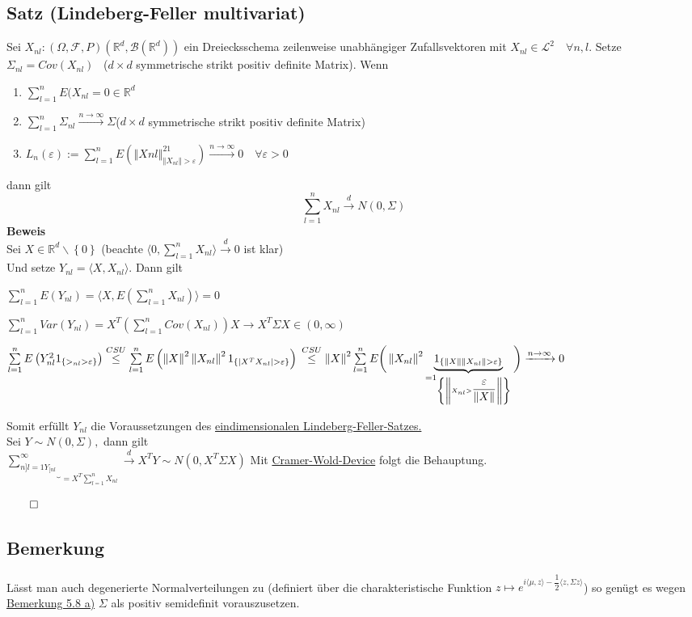 \documentclass[german,10pt,oneside, fleqn, a4paper]{article}
\newcommand {\R}	{\mathbb{R}}
\newcommand{\ra}{\rightarrow}
\newcommand{\sm}[2][\infty]{\sum\limits_{#2}^{#1}}
\newcommand{\brc}[1]{\left(#1\right)}
\newcommand{\brac}[1]{\left\lbrace #1\right\rbrace}
\newcommand{\norm}[1]{\left\Vert #1 \right\Vert}
\newcommand{\QED}{\begin{flushright}$\qed$\end{flushright}}
\newcommand{\mc}[1]{\mathcal{#1}}
\newcommand{\lp}[1]{\mc{L}^{#1}}
\newcommand{\beweis}{\textbf{Beweis}\\}
\newcommand{\toinf}{\rightarrow\infty}
\newcommand{\1}[1]{1_{#1}}
\newcommand{\2}[1]{\1{\brac{#1}}}
\newcommand{\xr}[2][]{\xrightarrow[#1]{#2}}
\newcommand{\rbor}[1][d]{\brc{\R^{#1},\mc{B}\brc{\R^{#1}}}}
\newcommand{\raum}{\brc{\Omega,\mc{F},P}}
\begin{document}
\subsection{Satz (Lindeberg-Feller multivariat)}
\label{5.10}
Sei $X_{nl}:\raum\rbor$ ein Dreiecksschema zeilenweise unabhängiger Zufallsvektoren mit $X_{nl}\in\lp{2}\quad\forall n,l$. Setze $\Sigma_{nl}=Cov(X_{nl})$ \ ($d\times d$ symmetrische strikt positiv definite Matrix). Wenn\begin{enumerate}[label=(\alph*)]
\item $\sm[n]{l=1}E(X_{nl}=0\in\R^d$
\item $\sm[n]{l=1}\Sigma_{nl}\xr{n\toinf}\Sigma $($d\times d$ symmetrische strikt positiv definite Matrix)
\item $L_n(\varepsilon):=\sm[n]{l=1}E\brc{\norm{X{nl}}^2\1{\norm{X_{nl}}>\varepsilon}}\xr{n\toinf}0\quad\forall\varepsilon>0$
\end{enumerate}
dann gilt \[\sm[n]{l=1}X_{nl}\xr{d}N(0,\Sigma)\]
\beweis
Sei $X\in\R^d\backslash\brac{0}$ (beachte $\langle 0,\sm[n]{l=1}X_{nl}\rangle\xr{d}0$ ist klar)\\
Und setze $Y_{nl}=\langle X, X_{nl}\rangle$. Dann gilt\begin{list}{•}{}
\item $\sm[n]{l=1}E(Y_{nl})=\langle X,E\brc{\sm[n]{l=1}X_{nl}}\rangle=0$
\item  $\sm[n]{l=1}Var(Y_{nl})=X^T\brc{\sm[n]{l=1}Cov(X_{nl})}X\ra X^T\Sigma X\in(0,\infty)$
\item $\sm[n]{l=1}E\brc{Y_{nl}^2\2{>_{nl}>\varepsilon}}\overset{CSU}{\le}\sm[n]{l=1}E\brc{\norm{X}^2\norm{X_{nl}}^2\2{|X^TX_{nl}|>\varepsilon}}\\
\overset{CSU}{\le}\norm{X}^2\sm[n]{l=1}E\bigg(\norm{X_{nl}}^2\underbrace{\2{\norm{X}\norm{X_{nl}}>\varepsilon}}_{=\2{\norm{X_{nl}>\dfrac{\varepsilon}{\norm{X}}}}}\bigg)\xr{n\toinf}0$
\end{list}
Somit erfüllt $Y_{nl}$ die Voraussetzungen des  \hyperref[5.4]{eindimensionalen Lindeberg-Feller-Satzes.}\\
Sei $Y\sim N(0,\Sigma),$ dann gilt\\
$\underbrace{\sm{n]{l=1}Y_{[nl}}}_{=X^T\sm[n]{l=1}X_{nl}}\xr{d}X^TY\sim N(0,X^T\Sigma X)$
Mit \hyperref[4.13]{Cramer-Wold-Device} folgt die Behauptung.\QED
 
\subsection{Bemerkung}
\label{5.11}
Lässt man auch degenerierte Normalverteilungen zu (definiert über die charakteristische Funktion $z\mapsto e^{i\langle\mu,z\rangle-\dfrac{1}{2}\langle z,\Sigma z\rangle}$) so genügt es wegen \hyperref[5.8]{Bemerkung 5.8 a)} $\Sigma$ als positiv semidefinit vorauszusetzen.
\end{document}
